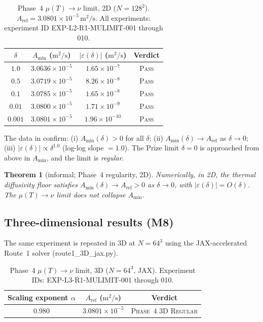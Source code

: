 \documentclass[12pt]{article}
\newtheorem{theorem}{Theorem}[section]
\newcommand{\eps}{\varepsilon}
\begin{document}
\begin{table}[ht]
  \centering
  \caption{Phase~4 $\mu(T)\to\nu$ limit, 2D ($N = 128^2$).
    $A_{\mathrm{ref}} = 3.0801\times10^{-5}\,\mathrm{m}^2/\mathrm{s}$.
    All experiments: experiment ID EXP-L2-R1-MULIMIT-001 through 010.}
  \label{tab:phase4-2D}
  \begin{tabular}{cccc}
    \toprule
    $\delta$ & $A_{\min}$ ($\mathrm{m}^2/\mathrm{s}$)
             & $|\eps(\delta)|$ ($\mathrm{m}^2/\mathrm{s}$) & Verdict \\
    \midrule
    $1.0$   & $3.0636\times10^{-5}$ & $1.65\times10^{-7}$ & \textsc{Pass} \\
    $0.5$   & $3.0719\times10^{-5}$ & $8.26\times10^{-8}$ & \textsc{Pass} \\
    $0.1$   & $3.0785\times10^{-5}$ & $1.65\times10^{-8}$ & \textsc{Pass} \\
    $0.01$  & $3.0800\times10^{-5}$ & $1.71\times10^{-9}$ & \textsc{Pass} \\
    $0.001$ & $3.0801\times10^{-5}$ & $1.96\times10^{-10}$& \textsc{Pass} \\
    \bottomrule
  \end{tabular}
\end{table}

The data in  confirm: (i) $A_{\min}(\delta) > 0$ for all
$\delta$; (ii) $A_{\min}(\delta)\to A_{\mathrm{ref}}$ as $\delta\to 0$; (iii)
$|\eps(\delta)| \propto \delta^{1.0}$ (log-log slope $= 1.0$).  The Prize limit
$\delta = 0$ is approached from above in $A_{\min}$, and the limit is
\emph{regular}.

\begin{theorem}[informal; Phase~4 regularity, 2D]
  \label{thm:phase4-2D}
  Numerically, in 2D, the thermal diffusivity floor satisfies
  $A_{\min}(\delta) \to A_{\mathrm{ref}} > 0$ as $\delta\to 0$, with
  $|\eps(\delta)| = O(\delta)$.  The $\mu(T)\to\nu$ limit does not collapse
  $A_{\min}$.
\end{theorem}

\subsection{Three-dimensional results (M8)}
\label{ssec:phase4-3D}

The same experiment is repeated in 3D at $N = 64^3$ using the JAX-accelerated
Route~1 solver (route1\_3D\_jax.py).

\begin{table}[ht]
  \centering
  \caption{Phase~4 $\mu(T)\to\nu$ limit, 3D ($N = 64^3$, JAX).
    Experiment IDs: EXP-L3-R1-MULIMIT-001 through 010.}
  \label{tab:phase4-3D}
  \begin{tabular}{ccc}
    \toprule
    Scaling exponent $\alpha$ & $A_{\mathrm{ref}}$ ($\mathrm{m}^2/\mathrm{s}$)
                              & Verdict \\
    \midrule
    $0.980$ & $3.0801\times10^{-5}$ & \textsc{Phase~4 3D Regular} \\
    \bottomrule
  \end{tabular}
\end{table}
\end{document}
